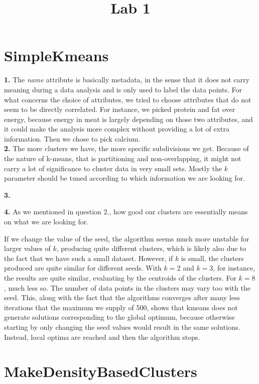 \documentclass[]{article}
\title{Lab 1}
\author{}
\begin{document}
\maketitle

\section{SimpleKmeans}

\textbf{1.} The \textit{name} attribute is basically metadata, in the sense that it does not carry meaning during a data analysis and is only used to label the data points. For what concerns the choice of attributes, we tried to choose attributes that do not seem to be directly correlated. For instance, we picked protein and fat over energy, because energy in meat is largely depending on those two attributes, and it could make the analysis more complex without providing a lot of extra information. Then we chose to pick calcium.\\


\noindent\textbf{2.} The more clusters we have, the more specific subdivisions we get. Because of the nature of k-means, that is partitioning and non-overlapping, it might not carry a lot of significance to cluster data in very small sets. Mostly the $k$ parameter should be tuned according to which information we are looking for.


\noindent\textbf{3.}


\noindent\textbf{4.} As we mentioned in question 2., how good our clusters are essentially means on what we are looking for. 

If we change the value of the seed, the algorithm seems much more unstable for larger values of $k$, producing quite different clusters, which is likely also due to the fact that we have such a small dataset. However, if $k$ is small, the clusters produced are quite similar for different seeds. With $k=2$ and $k=3$, for instance, the results are quite similar, evaluating by the centroids of the clusters. For $k=8$, much less so. The number of data points in the clusters may vary too with the seed. This, along with the fact that the algorithms converges after many less iterations that the maximum we supply of 500, shows that kmeans does not generate solutions corresponding to the global optimum, because otherwise starting by only changing the seed values would result in the same solutions. Instead, local optima are reached and then the algorithm stops.

\section{MakeDensityBasedClusters}
\end{document}
